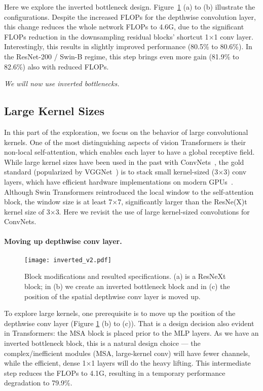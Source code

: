 Here we explore the inverted bottleneck design. Figure~\ref{fig:inverted} (a) to (b) illustrate the configurations. Despite the increased FLOPs for the depthwise convolution layer, this change reduces the whole network FLOPs to 4.6G, due to the significant FLOPs reduction in the downsampling residual blocks' shortcut 1$\times$1 conv layer.
Interestingly, this results in slightly improved performance (80.5\% to 80.6\%). In the ResNet-200 / Swin-B regime, this step brings even more gain (81.9\% to 82.6\%) also with reduced FLOPs.

\textit{We will now use inverted bottlenecks.}

\subsection{Large Kernel Sizes}

In this part of the exploration, we focus on the behavior of large convolutional kernels. One of the most distinguishing aspects of vision Transformers is their non-local self-attention, which enables each layer to have a global receptive field. While large kernel sizes have been used in the past with ConvNets~\cite{alexnet,Szegedy2015}, the gold standard (popularized by VGGNet~\cite{vgg}) is to stack small kernel-sized (3$\times$3) conv layers, which have efficient hardware implementations on modern GPUs~\cite{Lavin2016FastAF}. Although Swin Transformers reintroduced the local window to the self-attention block, the window size is at least 7$\times$7, significantly larger than the ResNe(X)t kernel size of 3$\times$3. Here we revisit the use of large kernel-sized convolutions for ConvNets. 

\paragraph{Moving up depthwise conv layer.}

\begin{figure}
\centering
\texttt{[image: inverted\_v2.pdf]}
\caption{Block modifications and resulted specifications. (a) is a ResNeXt block; in (b) we create an inverted bottleneck block and in (c) the position of the spatial depthwise conv layer is moved up.}
\label{fig:inverted}
\end{figure}

 To explore large kernels, one prerequisite is to move up the position of the depthwise conv layer (Figure \ref{fig:inverted} (b) to (c)). That is a design decision also evident in Transformers: the MSA block is placed prior to the MLP layers. As we have an inverted bottleneck block, this is a natural design choice --- the complex/inefficient modules (MSA, large-kernel conv) will have fewer channels, while the efficient, dense 1$\times$1 layers will do the heavy lifting. This intermediate step reduces the FLOPs to 4.1G, resulting in a temporary performance degradation to 79.9\%.

